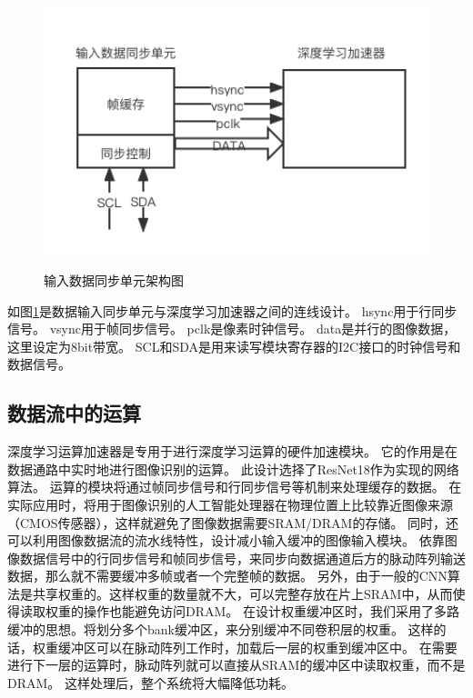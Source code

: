 \begin{figure}[htbp]
    \centering
    \includegraphics[width=12cm,height=8cm]{figures/input_data_adapter.png}
    \caption{输入数据同步单元架构图}
    \label{fig:input_data_adapter}
\end{figure}

如图\ref{fig:input_data_adapter}是数据输入同步单元与深度学习加速器之间的连线设计。
hsync用于行同步信号。
vsync用于帧同步信号。
pclk是像素时钟信号。
data是并行的图像数据，这里设定为8bit带宽。
SCL和SDA是用来读写模块寄存器的I2C接口的时钟信号和数据信号。


\subsection{数据流中的运算}
深度学习运算加速器是专用于进行深度学习运算的硬件加速模块。
它的作用是在数据通路中实时地进行图像识别的运算。
此设计选择了ResNet18作为实现的网络算法。
运算的模块将通过帧同步信号和行同步信号等机制来处理缓存的数据。
在实际应用时，将用于图像识别的人工智能处理器在物理位置上比较靠近图像来源（CMOS传感器），这样就避免了图像数据需要SRAM/DRAM的存储。
同时，还可以利用图像数据流的流水线特性，设计减小输入缓冲的图像输入模块。
依靠图像数据信号中的行同步信号和帧同步信号，来同步向数据通道后方的脉动阵列输送数据，那么就不需要缓冲多帧或者一个完整帧的数据。
另外，由于一般的CNN算法是共享权重的。这样权重的数量就不大，可以完整存放在片上SRAM中，从而使得读取权重的操作也能避免访问DRAM。
在设计权重缓冲区时，我们采用了多路缓冲的思想。将划分多个bank缓冲区，来分别缓冲不同卷积层的权重。
这样的话，权重缓冲区可以在脉动阵列工作时，加载后一层的权重到缓冲区中。
在需要进行下一层的运算时，脉动阵列就可以直接从SRAM的缓冲区中读取权重，而不是DRAM。
这样处理后，整个系统将大幅降低功耗。

